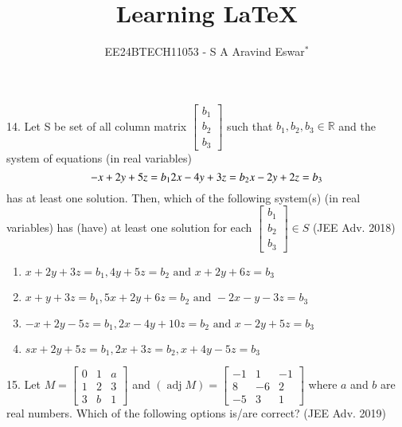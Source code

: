 \documentclass[journal,12pt,twocolumn]{IEEEtran}
\theoremstyle{remark}
\begin{document}

\vspace{3cm}

\title{Learning {\LaTeX}}
\author{EE24BTECH11053 - S A Aravind Eswar$^{*}$}
\maketitle
\newpage
\bigskip

\renewcommand{\thefigure}{\theenumi}
\renewcommand{\thetable}{\theenumi}
\section{}
14. Let S be set of all column matrix $\begin{bmatrix}
    b_1\\
    b_2\\
    b_3
\end{bmatrix}$ such that $b_1, b_2, b_3 \in \mathbb{R}$ and the system of equations (in real variables) $$
    -x+2y+5z=b_1\\
    2x-4y+3z=b_2\\
    x-2y+2z=b_3
$$ has at least one solution. Then, which of the following system(s) (in real variables) has (have) at least one solution for each $\begin{bmatrix}
    b_1\\
    b_2\\
    b_3
\end{bmatrix}\in S$ \hfill(JEE Adv. 2018)

\begin{enumerate}
    \item $x+2y+3z=b_1, 4y+5z=b_2 \text{ and }x+2y+6z=b_3$
    \item $x+y+3z=b_1, 5x+2y+6z=b_2\text{ and }-2x-y-3z=b_3$
    \item $-x+2y-5z=b_1,2x-4y+10z=b_2\text{ and }x-2y+5z=b_3$
    \item $sx+2y+5z=b_1,2x+3z=b_2,x+4y-5z=b_3$\\[2pt]
\end{enumerate}

15. Let $M=\begin{bmatrix}
    0 & 1 & a\\
    1 & 2 & 3\\
    3 & b & 1
\end{bmatrix}$ and $(\mathop{adj}M)=\begin{bmatrix}
    -1 & 1 & -1\\
    8 & -6 & 2\\
    -5 & 3 & 1
\end{bmatrix}$ where $a$ and $b$ are real numbers. Which of the following options is/are correct? \hfill (JEE Adv. 2019)
\end{document}
